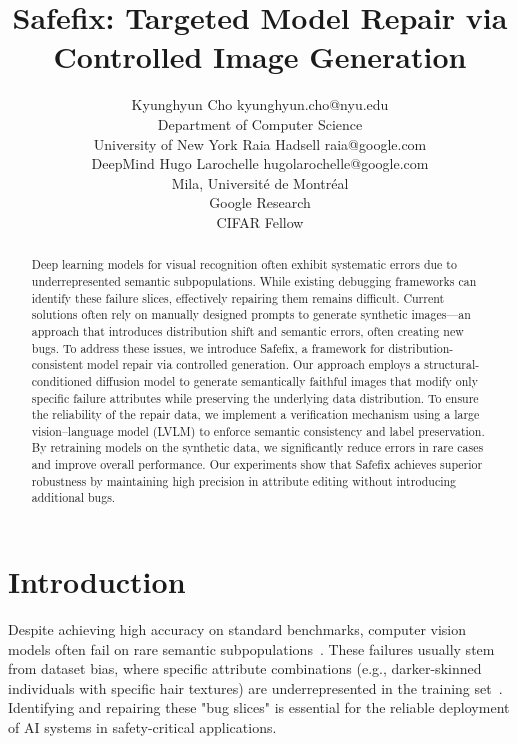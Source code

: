 \documentclass[10pt]{article} %
\title{Safefix: Targeted Model Repair via Controlled Image Generation}
\author{\name Kyunghyun Cho \email kyunghyun.cho@nyu.edu \\
      \addr Department of Computer Science\\
      University of New York
      \AND
      \name Raia Hadsell \email raia@google.com \\
      \addr DeepMind
      \AND
      \name Hugo Larochelle \email hugolarochelle@google.com\\
      \addr Mila, Universit\'e de Montr\'eal \\
      Google Research\\
      CIFAR Fellow}
\newcommand{\model}{Safefix\xspace}
\begin{document}
\maketitle

\begin{abstract}
Deep learning models for visual recognition often exhibit systematic errors due to underrepresented semantic subpopulations. While existing debugging frameworks can identify these failure slices, effectively repairing them remains difficult. Current solutions often rely on manually designed prompts to generate synthetic images—an approach that introduces distribution shift and semantic errors, often creating new bugs. To address these issues, we introduce \model, a framework for distribution-consistent model repair via controlled  generation. Our approach employs a structural-conditioned diffusion model to generate semantically faithful images that modify only specific failure attributes while preserving the underlying data distribution. To ensure the reliability of the repair data, we implement a  verification mechanism using a large vision--language model (LVLM) to enforce semantic consistency and label preservation. By retraining models on the synthetic data, we significantly reduce errors in rare cases and improve overall performance. Our experiments show that \model achieves superior robustness by maintaining high precision in attribute editing without introducing additional bugs.
\end{abstract}

\section{Introduction}
Despite achieving high accuracy on standard benchmarks, computer vision models often fail on rare semantic subpopulations~\citep{barbu2019objectnet,gao2023adaptive,leclerc20223db}. These failures usually stem from dataset bias, where specific attribute combinations (e.g., darker-skinned individuals with specific hair textures) are underrepresented in the training set~\citep{buolamwini2018gender}. Identifying and repairing these "bug slices" is essential for the reliable deployment of AI systems in safety-critical applications.
\end{document}
